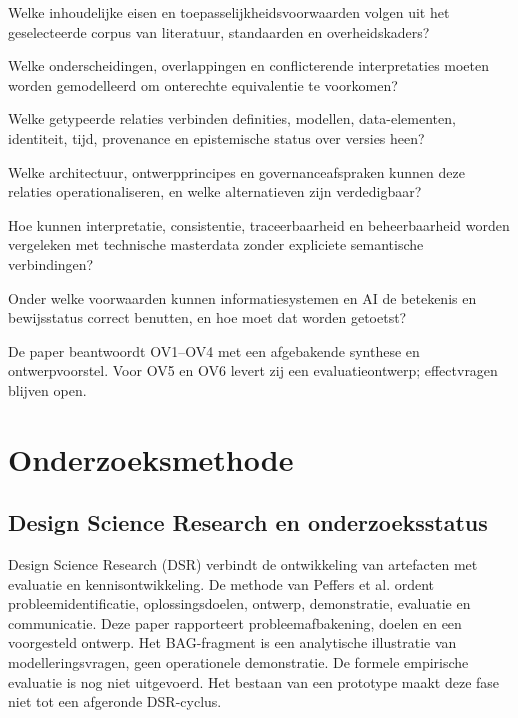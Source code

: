 \begin{description}[style=nextline,leftmargin=0pt,labelwidth=0pt]
\item[OV1 --- Eisen en toepasselijkheid.] Welke inhoudelijke eisen en toepasselijkheidsvoorwaarden volgen uit het geselecteerde corpus van literatuur, standaarden en overheidskaders?
\item[OV2 --- Abstractieniveaus en semantische hiaten.] Welke onderscheidingen, overlappingen en conflicterende interpretaties moeten worden gemodelleerd om onterechte equivalentie te voorkomen?
\item[OV3 --- Integratie.] Welke getypeerde relaties verbinden definities, modellen, data-elementen, identiteit, tijd, provenance en epistemische status over versies heen?
\item[OV4 --- Ontwerp en beheer.] Welke architectuur, ontwerpprincipes en governanceafspraken kunnen deze relaties operationaliseren, en welke alternatieven zijn verdedigbaar?
\item[OV5 --- Toetsbare meerwaarde.] Hoe kunnen interpretatie, consistentie, traceerbaarheid en beheerbaarheid worden vergeleken met technische masterdata zonder expliciete semantische verbindingen?
\item[OV6 --- Machineconsumptie.] Onder welke voorwaarden kunnen informatiesystemen en AI de betekenis en bewijsstatus correct benutten, en hoe moet dat worden getoetst?
\end{description}
De paper beantwoordt OV1--OV4 met een afgebakende synthese en ontwerpvoorstel. Voor OV5 en OV6 levert zij een evaluatieontwerp; effectvragen blijven open.

\section{Onderzoeksmethode}
\subsection{Design Science Research en onderzoeksstatus}
Design Science Research (DSR) verbindt de ontwikkeling van artefacten met evaluatie en kennisontwikkeling. De methode van Peffers et al. ordent probleemidentificatie, oplossingsdoelen, ontwerp, demonstratie, evaluatie en communicatie. \citep{L01,L02} Deze paper rapporteert probleemafbakening, doelen en een voorgesteld ontwerp. Het BAG-fragment is een analytische illustratie van modelleringsvragen, geen operationele demonstratie. De formele empirische evaluatie is nog niet uitgevoerd. Het bestaan van een prototype maakt deze fase niet tot een afgeronde DSR-cyclus.

